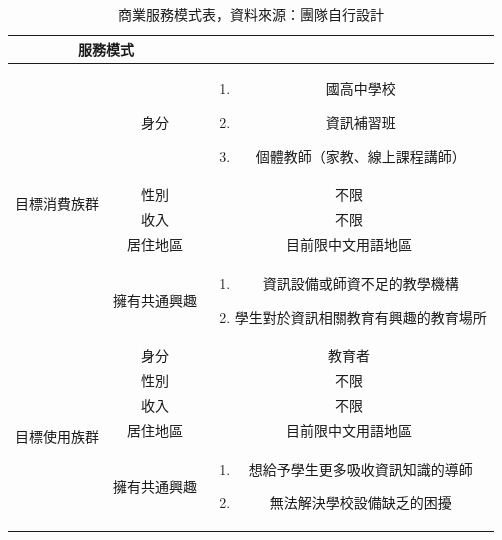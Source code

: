 \begin{table}[H]
  \centering
  \begin{tabular}{|c|c|c|}
    \hline
    \multicolumn{2}{|c|}{服務模式} & \\
    \hline
    \multirow{5}{*}[-0.5ex]{目標消費族群} & 身分 & 
    \begin{minipage}[c]{0.5\columnwidth}
      \vspace{0.3em}
      \begin{enumerate}[label=(\arabic*)]
        \setlength{\parindent}{1em}
        \item 國高中學校
        \item 資訊補習班
        \item 個體教師（家教、線上課程講師）
      \end{enumerate}
      \vspace{0.05em}
    \end{minipage} \\
    \cline{2-3}
    ~ & 性別 & 不限 \\
    \cline{2-3}
    ~ & 收入 & 不限 \\
    \cline{2-3}
    ~ & 居住地區 & 目前限中文用語地區 \\
    \cline{2-3}
    ~ & 擁有共通興趣 &
    \begin{minipage}[c]{0.5\columnwidth}
      \vspace{0.3em}
      \begin{enumerate}[label=(\arabic*)]
        \setlength{\parindent}{1em}
        \item 資訊設備或師資不足的教學機構
        \item 學生對於資訊相關教育有興趣的教育場所
      \end{enumerate}
      \vspace{0.05em}
    \end{minipage} \\
    \hline
    \multirow{5}{*}[-0.5ex]{目標使用族群} & 身分 & 教育者 \\
    \cline{2-3}
    ~ & 性別 & 不限 \\
    \cline{2-3}
    ~ & 收入 & 不限 \\
    \cline{2-3}
    ~ & 居住地區 & 目前限中文用語地區 \\
    \cline{2-3}
    ~ & 擁有共通興趣 & 
      \begin{minipage}[c]{0.5\columnwidth}
        \vspace{0.3em}
        \begin{enumerate}[label=(\arabic*)]
          \setlength{\parindent}{2em}
          \item 想給予學生更多吸收資訊知識的導師
          \item 無法解決學校設備缺乏的困擾
        \end{enumerate}
        \vspace{0.05em}
      \end{minipage} \\
    \hline
  \end{tabular}
  \caption{商業服務模式表，資料來源：團隊自行設計}
\end{table}
\newpage
